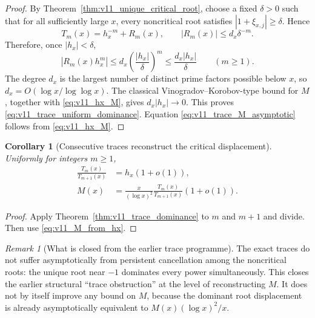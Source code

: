 \documentclass[11pt]{amsart}
\numberwithin{equation}{section}
\theoremstyle{plain}
\newtheorem{corollary}[theorem]{Corollary}
\theoremstyle{definition}
\theoremstyle{remark}
\newtheorem{remark}[theorem]{Remark}
\begin{document}
\begin{proof}
By Theorem~\ref{thm:v11_unique_critical_root}, choose a fixed \(\delta>0\)
such that for all sufficiently large \(x\), every noncritical root satisfies
\(|1+\xi_{x,j}|\ge\delta\).  Hence
\begin{equation}
T_m(x)
=h_x^{-m}+R_m(x),
\qquad
|R_m(x)|\le d_x\delta^{-m}.
\label{eq:v11_trace_split}
\end{equation}
Therefore, once \(|h_x|<\delta\),
\begin{equation}
|R_m(x)h_x^m|
\le d_x\left(\frac{|h_x|}{\delta}\right)^m
\le \frac{d_x|h_x|}{\delta}
\qquad(m\ge1).
\label{eq:v11_trace_relative_bound}
\end{equation}
The degree \(d_x\) is the largest number of distinct prime factors possible
below \(x\), so \(d_x=O(\log x/\log\log x)\).  The classical
Vinogradov--Korobov-type bound for \(M\), together with
\eqref{eq:v11_hx_M}, gives \(d_x|h_x|\to0\).  This proves
\eqref{eq:v11_trace_uniform_dominance}.  Equation
\eqref{eq:v11_trace_M_asymptotic} follows from
\eqref{eq:v11_hx_M}.
\end{proof}

\begin{corollary}[Consecutive traces reconstruct the critical displacement]
\label{cor:v11_trace_ratio}
Uniformly for integers \(m\ge1\),
\begin{align}
\frac{T_m(x)}{T_{m+1}(x)}
&=h_x(1+o(1)),
\label{eq:v11_trace_ratio_h}\\
M(x)
&=\frac{x}{(\log x)^2}
\frac{T_m(x)}{T_{m+1}(x)}(1+o(1)).
\label{eq:v11_trace_ratio_M}
\end{align}
\end{corollary}

\begin{proof}
Apply Theorem~\ref{thm:v11_trace_dominance} to \(m\) and \(m+1\) and divide.
Then use \eqref{eq:v11_M_from_hx}.
\end{proof}

\begin{remark}[What is closed from the earlier trace programme]
\label{rem:v11_trace_obstruction_closed}
The exact traces do not suffer asymptotically from persistent cancellation
among the noncritical roots: the unique root near \(-1\) dominates every
power simultaneously.  This closes the earlier structural ``trace
obstruction'' at the level of reconstructing \(M\).  It does not by itself
improve any bound on \(M\), because the dominant root displacement is already
asymptotically equivalent to \(M(x)(\log x)^2/x\).
\end{remark}
\end{document}

